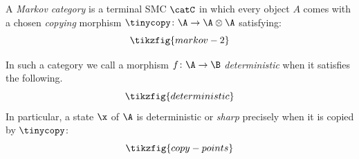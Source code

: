 \documentclass{article}
\begin{document}
\begin{definition}
\cite{fritz2020synthetic} \label{def:Markov_category}
A \emph{Markov category} is a terminal SMC $\catC$ in which every object $A$ comes with a chosen \emph{copying} morphism $\tinycopy \colon \A \to \A \otimes \A$ satisfying:
\[
\tikzfig{markov-2}
\] 
\end{definition}
In such a category we call a morphism $f \colon \A \to \B $ \emph{deterministic} when it satisfies the following. 
\begin{equation} \label{eq:deterministic}
\tikzfig{deterministic}
\end{equation}
In particular, a state $\x$ of $\A$ is deterministic or \emph{sharp} precisely when it is copied by $\tinycopy$:
\begin{equation} \label{eq:copy-points}
	\tikzfig{copy-points}
\end{equation} 
\end{document}
